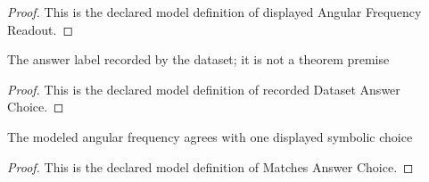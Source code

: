 \begin{proof}
  This is the declared model definition of displayed Angular Frequency Readout.
\end{proof}
\begin{definition}
  \label{def:physics:phyx-mini-0272:phyxminiproblems-problemphyxmini0272-recordeddatasetanswerchoice}
  The answer label recorded by the dataset; it is not a theorem premise
\end{definition}
\begin{proof}
  This is the declared model definition of recorded Dataset Answer Choice.
\end{proof}
\begin{definition}
  \label{def:physics:phyx-mini-0272:phyxminiproblems-problemphyxmini0272-matchesanswerchoice}
  The modeled angular frequency agrees with one displayed symbolic choice
\end{definition}
\begin{proof}
  This is the declared model definition of Matches Answer Choice.
\end{proof}
